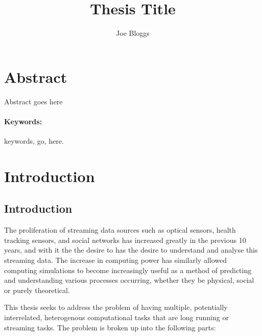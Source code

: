 \documentclass[a4paper,12pt,oldfontcommands]{memoir}
\title{Thesis Title}
\author{Joe Bloggs}
\begin{document}
\frontmatter
\maketitle

\pagebreak
\tableofcontents
\vfill
\pagebreak
\printglossary[type=\acronymtype,title=Abbreviations]
\vfill

\chapter{Abstract}\label{abstract}

Abstract goes here

\subsubsection{Keywords:} 
keywords, go, here.

\mainmatter

\chapter{Introduction} %

\label{Chapter1} %


\newcommand{\keyword}[1]{\textbf{#1}}
\newcommand{\tabhead}[1]{\textbf{#1}}
\newcommand{\code}[1]{\texttt{#1}}
\newcommand{\file}[1]{\texttt{\bfseries#1}}
\newcommand{\option}[1]{\texttt{\itshape#1}}

\section{Introduction}
The proliferation of streaming data sources such as optical sensors, health tracking sensors, and social networks has increased greatly in the previous 10 years, and with it the the desire to has the desire to understand and analyse this streaming data. The increase in computing power has similarly allowed computing simulations to become increasingly useful as a method of predicting and understanding various processes occurring, whether they be physical, social or purely theoretical.

This thesis seeks to address the problem of having multiple, potentially interrelated, heterogenous computational tasks that are long running or streaming tasks. The problem is broken up into the following parts:
\end{document}
